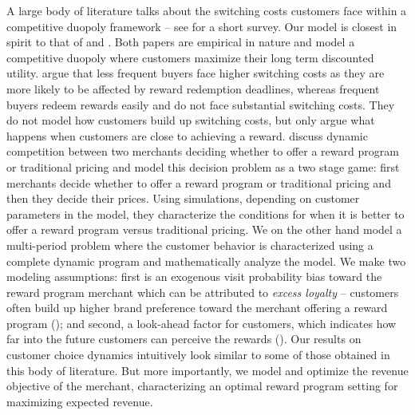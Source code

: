 A large body of literature talks about the switching costs customers face within a competitive duopoly framework -- see \cite{villas2015short} for a short survey.
Our model is closest in spirit to that of \cite{hartmann2008frequency} and \cite{kopalle2001economic}.
Both papers are empirical in nature and model a competitive duopoly where customers maximize their long term discounted utility.
\cite{hartmann2008frequency} argue that less frequent buyers face higher switching costs as they are more likely to be affected by reward redemption deadlines, whereas frequent buyers redeem rewards easily and do not face substantial switching costs. 
They do not model how customers build up switching costs, but only argue what happens when customers are close to achieving a reward.
\cite{kopalle2001economic} discuss dynamic competition between two merchants deciding whether to offer a reward program or traditional pricing and model this decision problem as a two stage game: first merchants decide whether to offer a reward program or traditional pricing and then they decide their prices. 
Using simulations, depending on customer parameters in the model, they characterize the conditions for when it is better to offer a reward program versus traditional pricing.
We on the other hand model a multi-period problem where the customer behavior is characterized using a complete dynamic program and mathematically analyze the model.
We make two modeling assumptions: first is an exogenous visit probability bias toward the reward program merchant which can be attributed to \emph{excess loyalty} -- customers often build up higher brand preference toward the merchant offering a reward program (\cite{fader1993excess, sharp1997loyalty}); 
and second, a look-ahead factor for customers, which indicates how far into the future customers can perceive the rewards (\cite{liu2007long,lewis2004influence}).
Our results on customer choice dynamics intuitively look similar to some of those obtained in this body of literature.
But more importantly, we model and optimize the revenue objective of the merchant, characterizing an optimal reward program setting for maximizing expected revenue.
